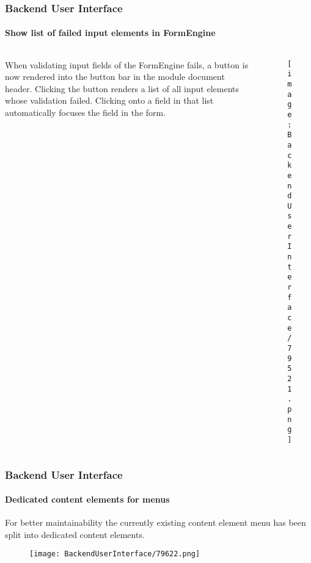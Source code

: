 \begin{frame}[fragile]
	\frametitle{Backend User Interface}
	\framesubtitle{Show list of failed input elements in FormEngine}

	\begin{columns}[T]
		\begin{column}{.35\textwidth}
			When validating input fields of the FormEngine fails, a button is now rendered into
			the button bar in the module document header. Clicking the button renders a list of
			all input elements whose validation failed. Clicking onto a field in that list
			automatically focuses the field in the form.
		\end{column}

		\begin{column}{.65\textwidth}
			\begin{figure}\vspace*{-0.6cm}
				\texttt{[image: BackendUserInterface/79521.png]}
			\end{figure}
		\end{column}
	\end{columns}

\end{frame}

\begin{frame}[fragile]
	\frametitle{Backend User Interface}
	\framesubtitle{Dedicated content elements for menus}

	For better maintainability the currently existing content element menu has been
	split into dedicated content elements.

	\begin{figure}\vspace{-0.2cm}
		\texttt{[image: BackendUserInterface/79622.png]}
	\end{figure}

\end{frame}

